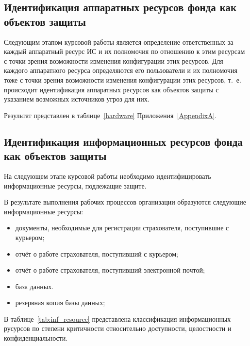 \subsection{Идентификация аппаратных ресурсов
  фонда как объектов защиты}

\point Следующим этапом курсовой работы является определение
ответственных за каждый аппаратный ресурс ИС и их полномочия по
отношению к этим ресурсам с точки зрения возможности изменения
конфигурации этих ресурсов. Для каждого аппаратного ресурса
определяются его пользователи и их полномочия тоже с точки зрения
возможности изменения конфигурации этих ресурсов, т.~е. происходит
идентификация аппаратных ресурсов как объектов защиты с указанием
возможных источников угроз для них.

\point Результат представлен в таблице~\ref{hardware} Приложения~\ref{AppendixA}.

\subsection{Идентификация информационных ресурсов
  фонда как объектов защиты}

\point На следующем этапе курсовой работы необходимо идентифицировать
информационные ресурсы, подлежащие защите.

\point В результате выполнения рабочих процессов организации
образуются следующие информационные ресурсы:

\begin{itemize}
\item документы, необходимые для регистрации страхователя, поступившие
  с курьером;
\item отчёт о работе страхователя, поступивший с курьером;
\item отчёт о работе страхователя, поступивший электронной почтой;
\item база данных.
\item резервная копия базы данных;
\end{itemize}

\point В таблице~\ref{tab:inf_resource} представлена классификация
информационных русурсов по степени критичности относительно
доступности, целостности и конфиденциальности.

